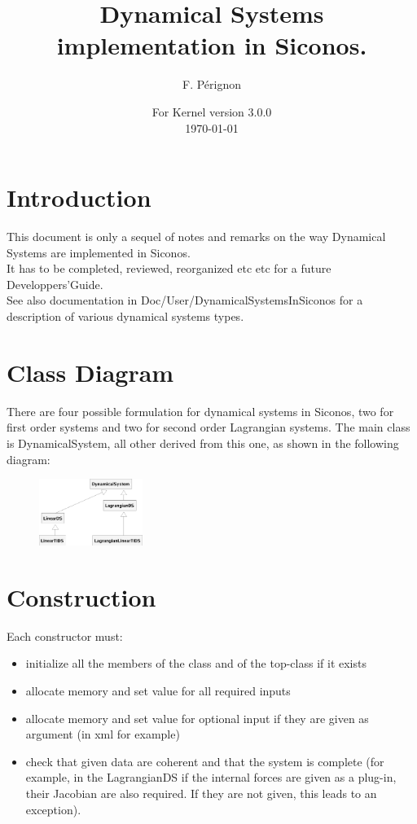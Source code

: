 \documentclass[10pt]{article}
\begin{document}
\thispagestyle{empty}
\title{Dynamical Systems implementation in Siconos.}
\author{F. P\'erignon}

\date{For Kernel version 3.0.0 \\
 \today}
\maketitle

\pagestyle{fancy}

\section{Introduction}
This document is only a sequel of notes and remarks on the way Dynamical Systems are implemented in Siconos.\\
It has to be completed, reviewed, reorganized etc etc for a future Developpers'Guide. \\
See also documentation in Doc/User/DynamicalSystemsInSiconos for a description of various dynamical systems types.

\section{Class Diagram}
There are four possible formulation for dynamical systems in Siconos,
two for first order systems and two for second order Lagrangian systems. The main class is DynamicalSystem, all other derived from this one, as shown in the following diagram:
\begin{figure}[htbp]
  \centering
 \includegraphics[width=0.3\textwidth]{./DSClassDiagram.eps}
  \label{DSDiagram}
\end{figure}

\section{Construction}

Each constructor must:
\begin{itemize}
\item initialize all the members of the class and of the top-class if it exists
\item allocate memory and set value for all required inputs
\item allocate memory and set value for optional input if they are given as argument (in xml for example)
\item check that given data are coherent and that the system is complete (for example, in the LagrangianDS
if the internal forces are given as a plug-in, their Jacobian are also required. If they are not given, this leads to an exception).
\end{itemize}
\end{document}
